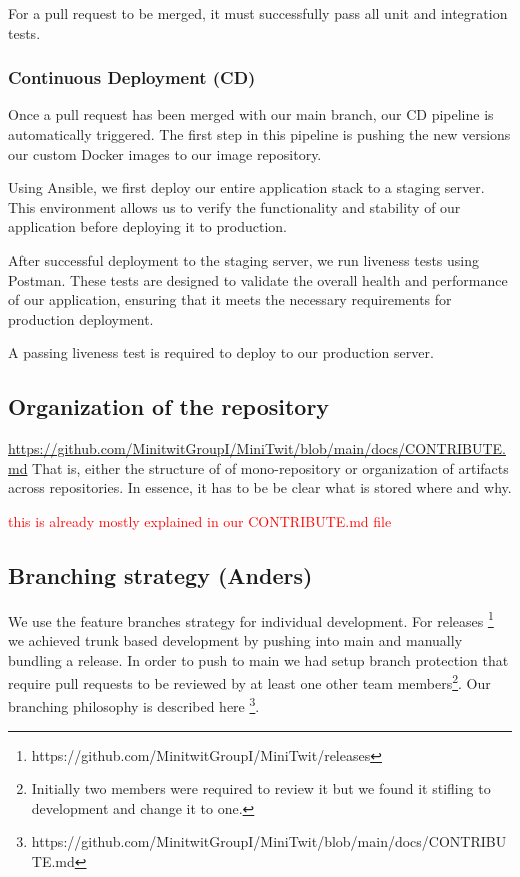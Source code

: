 \documentclass{article}
\begin{document}
For a pull request to be merged, it must successfully pass all unit and integration tests.

\subsubsection{Continuous Deployment (CD)}

Once a pull request has been merged with our main branch, our CD pipeline is automatically triggered. 
The first step in this pipeline is pushing the new versions our custom Docker images to our image repository. 

Using Ansible, we first deploy our entire application stack to a staging server. This environment allows us to verify the functionality and stability of our application before deploying it to production.

After successful deployment to the staging server, we run liveness tests using Postman. These tests are designed to validate the overall health and performance of our application, ensuring that it meets the necessary requirements for production deployment.

A passing liveness test is required to deploy to our production server. 

\subsection{Organization of the repository}

\url{https://github.com/MinitwitGroupI/MiniTwit/blob/main/docs/CONTRIBUTE.md}
That is, either the structure of of mono-repository or organization of artifacts across repositories.
In essence, it has to be be clear what is stored where and why.

\textcolor{red}{this is already mostly explained in our CONTRIBUTE.md file}

\subsection{Branching strategy (Anders)}

We use the feature branches strategy for individual development. For releases \footnote{https://github.com/MinitwitGroupI/MiniTwit/releases} we achieved trunk based development by pushing into main and manually bundling a release. In order to push to main we had setup branch protection that require pull requests to be reviewed by at least one other team members\footnote{Initially two members were required to review it but we found it stifling to development and change it to one.}. Our branching philosophy is described here \footnote{https://github.com/MinitwitGroupI/MiniTwit/blob/main/docs/CONTRIBUTE.md}.
\end{document}

